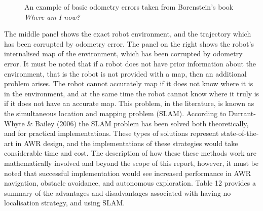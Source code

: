 \documentclass[a4paper]{article}
\begin{document}
\begin{figure}[h]
\begin{minipage}{0.45\textwidth}
\caption{An example of basic odometry errors taken from Borenstein's book \textit{Where am I now?}}
\end{minipage}
\end{figure}

The middle panel shows the exact robot environment, and the
trajectory which has been corrupted by odometry error. The panel on the right shows the robot’s internalised map
of the environment, which has been corrupted by odometry error. It must be noted that if a robot does not have prior information about the environment, that is the robot is not provided with a map, then an additional problem arises. The robot cannot accurately map if it does not know where it is in the environment, and at the same time the robot cannot know where it truly is if it does not have an accurate map. This problem, in the literature, is known as the simultaneous location and mapping problem (SLAM). According to Durrant-Whyte \& Bailey (2006) the SLAM problem has been solved both theoretically, and for practical implementations. These types of solutions represent state-of-the-art in AWR design, and the implementations of these strategies would take considerable time and cost. The description of how these these methods work are mathematically involved and beyond the scope of this report, however, it must be noted that successful implementation would see increased performance in AWR navigation, obstacle avoidance, and autonomous exploration. Table 12 provides a summary of the advantages and disadvantages associated with having no localisation strategy, and using SLAM.
\end{document}
